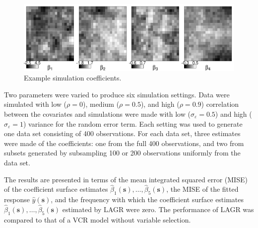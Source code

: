\documentclass[authoryear,review, 12pt]{elsarticle}
\begin{document}
\begin{figure}
    \includegraphics[width=\textwidth]{figure/coefs.pdf}
    \caption{Example simulation coefficients. \label{fig:simulation-coefficients}}
\end{figure}

Two parameters were varied to produce six simulation settings.
Data were simulated with low ($\rho=0$), medium ($\rho=0.5$), and high ($\rho=0.9$)
correlation between the covariates and simulations were made with
low ($\sigma_{\varepsilon}=0.5$) and high ($\sigma_{\varepsilon}=1$)
variance for the random error term. Each setting was used to generate one data set consisting of 400 observations.
For each data set, three estimates were made of the coefficients: one from the full 400 observations, and two from subsets generated by subsampling 100 or 200 observations uniformly from the data set.

The results are presented in terms of the mean integrated squared
error (MISE) of the coefficient surface estimates $\hat{\beta}_{1}(\bm{s}),\dots,\hat{\beta}_{5}(\bm{s})$,
the MISE of the fitted response $\hat{y}(\bm{s})$, and the frequency
with which the coefficient surface estimates $\hat{\beta}_{1}(\bm{s}),\dots,\hat{\beta}_{5}(\bm{s})$
estimated by LAGR were zero. The performance of LAGR was compared
to that of a VCR model without variable selection.
\end{document}
